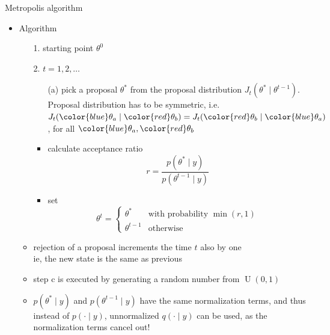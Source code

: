 \documentclass[finnish,english,t]{beamer}
\DeclareMathOperator{\U}{U}
\begin{document}
\begin{frame}{Metropolis algorithm}

  \begin{itemize}
  \item Algorithm
    \begin{itemize}
      \item[1.] starting point $\theta^0$
      \item[2.] $t=1,2,\ldots$
        \begin{itemize}
        \item[(a)] pick a proposal $\theta^{*}$ from the proposal distribution
          $J_t(\theta^{*} \mid \theta^{t-1})$. \\
          Proposal distribution has to be symmetric, i.e.\\
          $J_t({\color{blue} \theta_a} \mid {\color{red} \theta_b})=J_t({\color{red} \theta_b} \mid {\color{blue} \theta_a})$, for all
          ${\color{blue} \theta_a},{\color{red} \theta_b}$
        \item<2->[(b)] calculate acceptance ratio
          \begin{equation*}
            r=\frac{p(\theta^{*} \mid y)}{p(\theta^{t-1} \mid y)}
          \end{equation*}
          \vspace{-6mm}
        \item<3->[(c)] set
          \begin{equation*}
            \theta^t=
            \begin{cases}
              \theta^{*} & \text{with probability $\min(r,1)$}\\
              \theta^{t-1} & \text{otherwise}
            \end{cases}
          \end{equation*}
      \end{itemize}
      \vspace{-1.5\baselineskip}
    \item<5-> rejection of a proposal increments the time $t$ also by one\\
      ie, the new state is the same as previous
      \item<6-> step c is executed by generating a random number from 
        $\U(0,1)$
      \item<7-> $p(\theta^* \mid y)$ and $p(\theta^{t-1} \mid y)$ have the same
        normalization terms, and thus instead of $p(\cdot \mid y)$,
        unnormalized $q(\cdot \mid y)$ can be used, as the normalization
        terms cancel out!
    \end{itemize}
  \end{itemize}

\end{frame}
\end{document}
